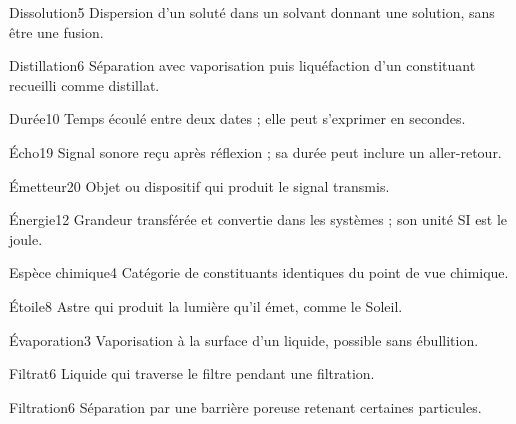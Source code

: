 \documentclass[12pt,twoside,openany]{book}
\begin{document}
\begin{pcLexique}{Dissolution}{5}
Dispersion d’un soluté dans un solvant donnant une solution, sans être une fusion.\par
\end{pcLexique}
\begin{pcLexique}{Distillation}{6}
Séparation avec vaporisation puis liquéfaction d’un constituant recueilli comme distillat.\par
\end{pcLexique}
\begin{pcLexique}{Durée}{10}
Temps écoulé entre deux dates ; elle peut s’exprimer en secondes.\par
\end{pcLexique}
\begin{pcLexique}{Écho}{19}
Signal sonore reçu après réflexion ; sa durée peut inclure un aller-retour.\par
\end{pcLexique}
\begin{pcLexique}{Émetteur}{20}
Objet ou dispositif qui produit le signal transmis.\par
\end{pcLexique}
\begin{pcLexique}{Énergie}{12}
Grandeur transférée et convertie dans les systèmes ; son unité SI est le joule.\par
\end{pcLexique}
\begin{pcLexique}{Espèce chimique}{4}
Catégorie de constituants identiques du point de vue chimique.\par
\end{pcLexique}
\begin{pcLexique}{Étoile}{8}
Astre qui produit la lumière qu’il émet, comme le Soleil.\par
\end{pcLexique}
\begin{pcLexique}{Évaporation}{3}
Vaporisation à la surface d’un liquide, possible sans ébullition.\par
\end{pcLexique}
\begin{pcLexique}{Filtrat}{6}
Liquide qui traverse le filtre pendant une filtration.\par
\end{pcLexique}
\begin{pcLexique}{Filtration}{6}
Séparation par une barrière poreuse retenant certaines particules.\par
\end{pcLexique}
\end{document}
